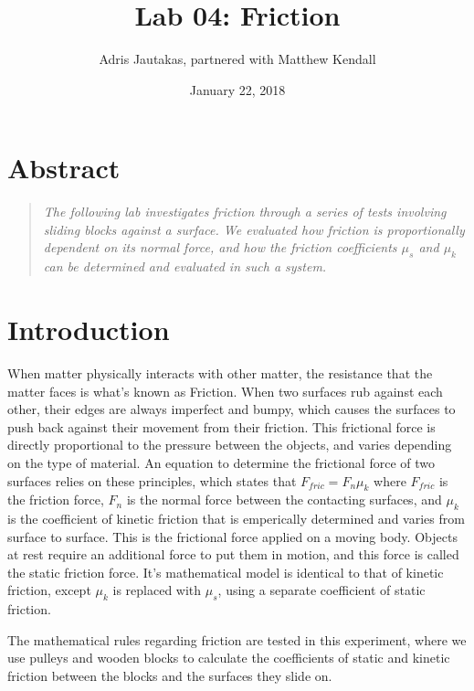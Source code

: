 \documentclass[12pt]{article}
\title{Lab 04: Friction}
\author{Adris Jautakas, partnered with Matthew Kendall}
\date{January 22, 2018}
\begin{document}
    \maketitle

    \pagebreak

    \section*{Abstract}
        \begin{quote}
        {\textit {\small 
            The following lab investigates friction through a series of tests 
            involving sliding blocks against a surface. We evaluated how 
            friction is proportionally dependent on its normal force, and how
            the friction coefficients $\mu_s$ and $\mu_k$ can be determined
            and evaluated in such a system.
        } }
        \end{quote}

    \section{Introduction}
        \par When matter physically interacts with other matter, the resistance
        that the matter faces is what's known as Friction. When two surfaces rub 
        against each other, their edges are always imperfect and bumpy, which 
        causes the surfaces to push back against their movement from their 
        friction. This frictional force is directly proportional to the pressure
        between the objects, and varies depending on the type of material. An
        equation to determine the frictional force of two surfaces relies on
        these principles, which states that $F_{fric} = F_n\mu_k$ where 
        $F_{fric}$ is the friction force, $F_n$ is the normal force between the
        contacting surfaces, and $\mu_k$ is the coefficient of kinetic friction
        that is emperically determined and varies from surface to surface. This
        is the frictional force applied on a moving body. Objects at rest require
        an additional force to put them in motion, and this force is called the
        static friction force. It's mathematical model is identical to that of
        kinetic friction, except $\mu_k$ is replaced with $\mu_s$, using a 
        separate coefficient of static friction.
        \par The mathematical rules regarding friction are tested in this
        experiment, where we use pulleys and wooden blocks to calculate the
        coefficients of static and kinetic friction between the blocks and the
        surfaces they slide on.
\end{document}
